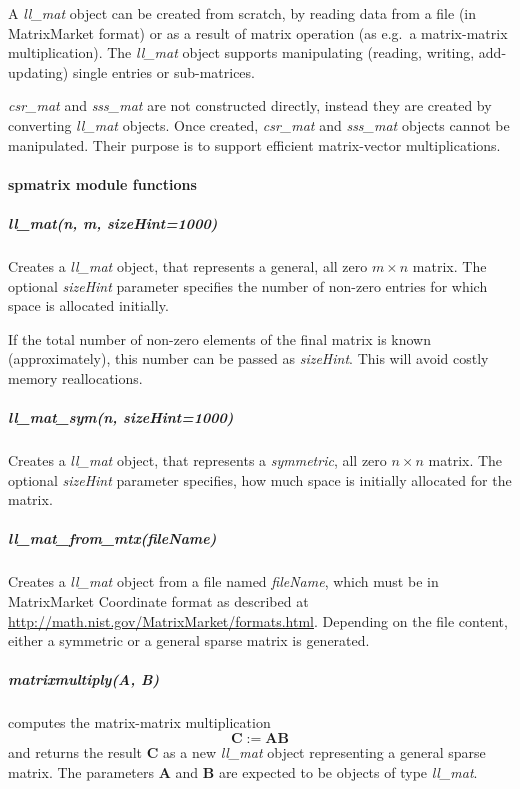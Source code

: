 \documentclass[a4paper]{article}
\newcommand{\mat}[1]{\ensuremath{\boldsymbol{#1}}}
\begin{document}
A \textit{ll\_mat} object can be created from scratch, by reading data
from a file (in MatrixMarket format) or as a result of matrix
operation (as e.g.\ a matrix-matrix multiplication). The
\textit{ll\_mat} object supports manipulating (reading, writing,
add-updating) single entries or sub-matrices.

\textit{csr\_mat} and \textit{sss\_mat} are not constructed directly,
instead they are created by converting \textit{ll\_mat} objects. Once
created, \textit{csr\_mat} and \textit{sss\_mat} objects cannot be
manipulated. Their purpose is to support efficient matrix-vector
multiplications.

\paragraph{spmatrix module functions}

\subparagraph{ll\_mat(n, m, sizeHint=1000)} 
%
Creates a \textit{ll\_mat} object, that represents a general, all zero
$m\times n$ matrix. The optional \textit{sizeHint} parameter specifies
the number of non-zero entries for which space is allocated initially.

If the total number of non-zero elements of the final matrix is known
(approximately), this number can be passed as \textit{sizeHint}. This
will avoid costly memory reallocations.

\subparagraph{ll\_mat\_sym(n, sizeHint=1000)} 
%
Creates a \textit{ll\_mat} object, that represents a \emph{symmetric},
all zero $n\times n$ matrix. The optional \textit{sizeHint} parameter
specifies, how much space is initially allocated for the matrix.

\subparagraph{ll\_mat\_from\_mtx(fileName)} 
%
Creates a \textit{ll\_mat} object from a file named \textit{fileName},
which must be in MatrixMarket Coordinate format as described at
\url{http://math.nist.gov/MatrixMarket/formats.html}. Depending on the
file content, either a symmetric or a general sparse matrix is
generated.

\subparagraph{matrixmultiply(A, B)}
%
computes the matrix-matrix multiplication 
\begin{equation*}
  \mat{C} := \mat{A}\mat{B}
\end{equation*}
and returns the result $\mat{C}$ as a new \textit{ll\_mat} object
representing a general sparse matrix. The parameters $\mat{A}$ and
$\mat{B}$ are expected to be objects of type \textit{ll\_mat}.
\end{document}
